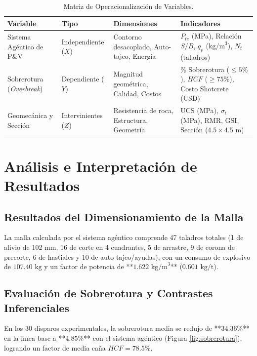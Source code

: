 \documentclass[12pt,a4paper,oneside]{book}
\begin{document}
\begin{table}[h!]
\centering
\small
\caption{Matriz de Operacionalización de Variables.}
\begin{tabular}{p{3.5cm}p{3cm}p{4cm}p{3.5cm}}
\toprule
\textbf{Variable} & \textbf{Tipo} & \textbf{Dimensiones} & \textbf{Indicadores} \\
\midrule
Sistema Agéntico de P\&V & Independiente ($X$) & Contorno desacoplado, Auto-tajeo, Energía & $P_{te}$ (MPa), Relación $S/B$, $q_p$ ($\text{kg/m}^3$), $N_t$ (taladros) \\
Sobrerotura (\textit{Overbreak}) & Dependiente ($Y$) & Magnitud geométrica, Calidad, Costos & \% Sobrerotura ($\le 5\%$), $HCF$ ($\ge 75\%$), Costo Shotcrete (USD) \\
Geomecánica y Sección & Intervinientes ($Z$) & Resistencia de roca, Estructura, Geometría & UCS (MPa), $\sigma_t$ (MPa), RMR, GSI, Sección ($4.5\times 4.5\text{ m}$) \\
\bottomrule
\end{tabular}
\label{tab:operacionalizacion}
\end{table}

\chapter{Análisis e Interpretación de Resultados}

\section{Resultados del Dimensionamiento de la Malla}
La malla calculada por el sistema agéntico comprende 47 taladros totales (1 de alivio de 102 mm, 16 de corte en 4 cuadrantes, 5 de arrastre, 9 de corona de precorte, 6 de hastiales y 10 de auto-tajeo/ayudas), con un consumo de explosivo de $107.40\text{ kg}$ y un factor de potencia de **$1.622\text{ kg/m}^3$** ($0.601\text{ kg/t}$).

\section{Evaluación de Sobrerotura y Contrastes Inferenciales}
En los 30 disparos experimentales, la sobrerotura media se redujo de **$34.36\%$** en la línea base a **$4.85\%$** con el sistema agéntico (Figura \ref{fig:sobrerotura}), logrando un factor de media caña $HCF = 78.5\%$.
\end{document}

